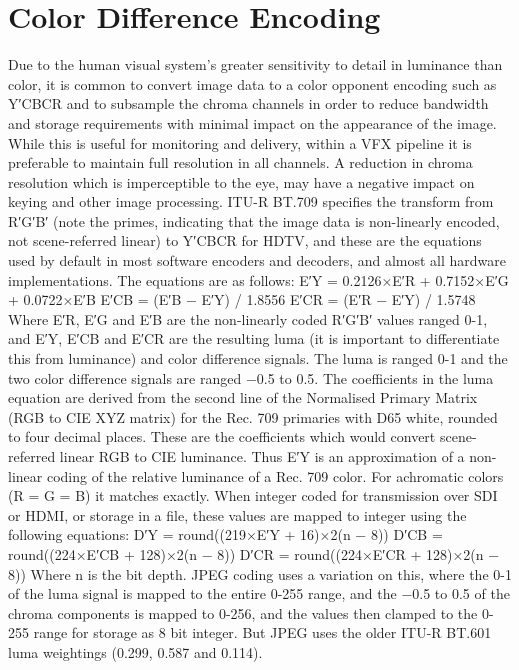 \section{Color Difference Encoding}
\label{sec:color-difference-encoding}

Due to the human visual system’s greater sensitivity to detail in luminance than color, it is common to convert image data to a color opponent encoding such as Y′CBCR and to subsample the chroma channels in order to reduce bandwidth and storage requirements with minimal impact on the appearance of the image. While this is useful for monitoring and delivery, within a VFX pipeline it is preferable to maintain full resolution in all channels. A reduction in chroma resolution which is imperceptible to the eye, may have a negative impact on keying and other image processing.
ITU-R BT.709 specifies the transform from R′G′B′ (note the primes, indicating that the image data is non-linearly encoded, not scene-referred linear) to Y′CBCR for HDTV, and these are the equations used by default in most software encoders and decoders, and almost all hardware implementations. The equations are as follows:
	E′Y = 0.2126×E′R + 0.7152×E′G + 0.0722×E′B
	E′CB =  (E′B − E′Y) / 1.8556
	E′CR =  (E′R − E′Y) / 1.5748
Where E′R, E′G and E′B are the non-linearly coded R′G′B′ values ranged 0-1, and E′Y, E′CB and E′CR are the resulting luma (it is important to differentiate this from luminance) and color difference signals. The luma is ranged 0-1 and the two color difference signals are ranged −0.5 to 0.5.
The coefficients in the luma equation are derived from the second line of the Normalised Primary Matrix (RGB to CIE XYZ matrix) for the Rec. 709 primaries with D65 white, rounded to four decimal places. These are the coefficients which would convert scene-referred linear RGB to CIE luminance. Thus E′Y is an approximation of a non-linear coding of the relative luminance of a Rec. 709 color. For achromatic colors (R = G = B) it matches exactly.
When integer coded for transmission over SDI or HDMI, or storage in a file, these values are mapped to integer using the following equations:
	D′Y = round((219×E′Y + 16)×2(n − 8))
	D′CB = round((224×E′CB + 128)×2(n − 8))
	D′CR = round((224×E′CR + 128)×2(n − 8))
Where n is the bit depth.
JPEG coding uses a variation on this, where the 0-1 of the luma signal is mapped to the entire 0-255 range, and the −0.5 to 0.5 of the chroma components is mapped to 0-256, and the values then clamped to the 0-255 range for storage as 8 bit integer. But JPEG uses the older ITU-R BT.601 luma weightings (0.299, 0.587 and 0.114).
